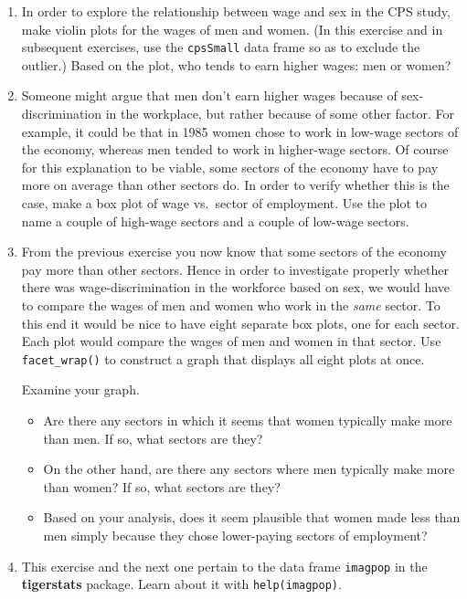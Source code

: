 \documentclass[]{book}
\providecommand{\tightlist}{%
  \setlength{\itemsep}{0pt}\setlength{\parskip}{0pt}}
\theoremstyle{definition}
\theoremstyle{definition}
\theoremstyle{definition}
\theoremstyle{remark}
\begin{document}
{\begin{enumerate}
  Write the code needed to find the age, sex and sector of employment of
  the person who made this extraoridinarily high wage. Report the age,
  sex and sector of this person.

  Create a new data frame called \texttt{cpsSmall} that is the same as
  \texttt{CPS85} except that it excludes the row corresponding to the
  outlier-individual.
\item
  In order to explore the relationship between wage and sex in the CPS
  study, make violin plots for the wages of men and women. (In this
  exercise and in subsequent exercises, use the \texttt{cpsSmall} data
  frame so as to exclude the outlier.) Based on the plot, who tends to
  earn higher wages: men or women?
\item
  Someone might argue that men don't earn higher wages because of
  sex-discrimination in the workplace, but rather because of some other
  factor. For example, it could be that in 1985 women chose to work in
  low-wage sectors of the economy, whereas men tended to work in
  higher-wage sectors. Of course for this explanation to be viable, some
  sectors of the economy have to pay more on average than other sectors
  do. In order to verify whether this is the case, make a box plot of
  wage vs.~sector of employment. Use the plot to name a couple of
  high-wage sectors and a couple of low-wage sectors.
\item
  From the previous exercise you now know that some sectors of the
  economy pay more than other sectors. Hence in order to investigate
  properly whether there was wage-discrimination in the workforce based
  on sex, we would have to compare the wages of men and women who work
  in the \emph{same} sector. To this end it would be nice to have eight
  separate box plots, one for each sector. Each plot would compare the
  wages of men and women in that sector. Use \texttt{facet\_wrap()} to
  construct a graph that displays all eight plots at once.

  Examine your graph.

  \begin{itemize}
  \tightlist
  \item
    Are there any sectors in which it seems that women typically make
    more than men. If so, what sectors are they?
  \item
    On the other hand, are there any sectors where men typically make
    more than women? If so, what sectors are they?
  \item
    Based on your analysis, does it seem plausible that women made less
    than men simply because they chose lower-paying sectors of
    employment?
  \end{itemize}
\item
  This exercise and the next one pertain to the data frame
  \texttt{imagpop} in the \textbf{tigerstats} package. Learn about it
  with \texttt{help(imagpop)}.


\end{enumerate}}
\end{document}
